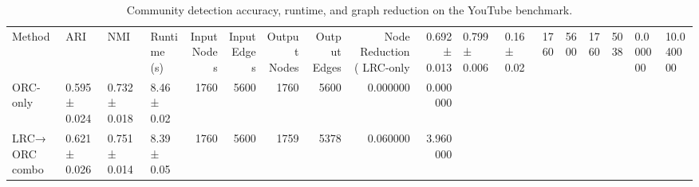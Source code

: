 \begin{table}
\caption{Community detection accuracy, runtime, and graph reduction on the YouTube benchmark.}
\label{tab:youtube_empirical_complexity}
\begin{tabular}{llllrrrrrr}
\toprule
Method & ARI & NMI & Runtime (s) & Input Nodes & Input Edges & Output Nodes & Output Edges & Node Reduction (%
\midrule
LRC-only & 0.692 ± 0.013 & 0.799 ± 0.006 & 0.16 ± 0.02 & 1760 & 5600 & 1760 & 5038 & 0.000000 & 10.040000 \\
ORC-only & 0.595 ± 0.024 & 0.732 ± 0.018 & 8.46 ± 0.02 & 1760 & 5600 & 1760 & 5600 & 0.000000 & 0.000000 \\
LRC→ORC combo & 0.621 ± 0.026 & 0.751 ± 0.014 & 8.39 ± 0.05 & 1760 & 5600 & 1759 & 5378 & 0.060000 & 3.960000 \\
\bottomrule
\end{tabular}
\end{table}

